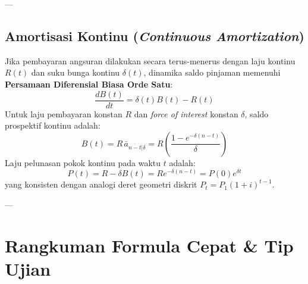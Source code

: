 \documentclass[11pt,a4paper]{article}
\begin{document}
---

\subsection{Amortisasi Kontinu (\textit{Continuous Amortization})}

Jika pembayaran angsuran dilakukan secara terus-menerus dengan laju kontinu $R(t)$ dan suku bunga kontinu $\delta(t)$, dinamika saldo pinjaman memenuhi \textbf{Persamaan Diferensial Biasa Orde Satu}:
\begin{equation}
    \frac{d B(t)}{dt} = \delta(t) B(t) - R(t)
\end{equation}
Untuk laju pembayaran konstan $R$ dan \textit{force of interest} konstan $\delta$, saldo prospektif kontinu adalah:
\begin{equation}
    B(t) = R \, \bar{a}_{\overline{n-t}|\delta} = R \left( \frac{1 - e^{-\delta(n-t)}}{\delta} \right)
\end{equation}
Laju pelunasan pokok kontinu pada waktu $t$ adalah:
\begin{equation}
    P(t) = R - \delta B(t) = R e^{-\delta(n-t)} = P(0) e^{\delta t}
\end{equation}
yang konsisten dengan analogi deret geometri diskrit $P_t = P_1(1+i)^{t-1}$.

---

\section{Rangkuman Formula Cepat \& Tip Ujian}
\end{document}
